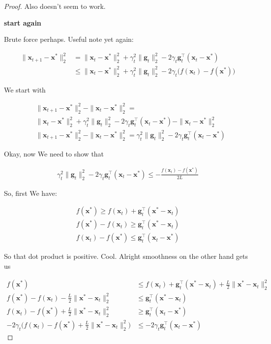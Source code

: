 \documentclass{article}
\begin{document}
\begin{proof}
	Also doesn't seem to work.
	
	\textbf{start again}
	
	Brute force perhaps. Useful note yet again:
	
	\begin{align}
		\|\mathbf{x}_{t+1} - \mathbf{x}^*\|^2_2 &= \|\mathbf{x}_t  - \mathbf{x}^* \|^2_2 + \gamma_t^2\|\mathbf{g}_t\|^2_2 - 2 \gamma_t\mathbf{g}^\top_t(\mathbf{x}_t - \mathbf{x}^*) \\
		&\le \|\mathbf{x}_t  - \mathbf{x}^* \|^2_2 + \gamma_t^2\|\mathbf{g}_t\|^2_2 - 2\gamma_t\big( f(\mathbf{x}_t) - f(\mathbf{x}^*) \big)
	\end{align}
	
	We start with
	
	\begin{align}
		&\|\mathbf{x}_{t+1} - \mathbf{x}^*\|^2_2 - \|\mathbf{x}_{t} - \mathbf{x}^*\|^2_2= \\
		&\|\mathbf{x}_t  - \mathbf{x}^* \|^2_2 + \gamma_t^2\|\mathbf{g}_t\|^2_2 - 2 \gamma_t\mathbf{g}^\top_t(\mathbf{x}_t - \mathbf{x}^*) -  \|\mathbf{x}_{t} - \mathbf{x}^*\|^2_2 \\
		&\|\mathbf{x}_{t+1} - \mathbf{x}^*\|^2_2 - \|\mathbf{x}_{t} - \mathbf{x}^*\|^2_2= \gamma_t^2\|\mathbf{g}_t\|^2_2 - 2 \gamma_t\mathbf{g}^\top_t(\mathbf{x}_t - \mathbf{x}^*) 
	\end{align}
	
	Okay, now We need to show that 
	
	\begin{align}
		\gamma_t^2\|\mathbf{g}_t\|^2_2 - 2 \gamma_t\mathbf{g}^\top_t(\mathbf{x}_t - \mathbf{x}^*) \le - \frac{f(\mathbf{x}_t) - f(\mathbf{x}^*)}{2L}
	\end{align}
	
	So,  first We have:
	
	\begin{align}
		f(\mathbf{x}^*) \ge f(\mathbf{x}_t) + \mathbf{g}_t^\top(\mathbf{x}^* - \mathbf{x}_t)\\
		f(\mathbf{x}^*) - f(\mathbf{x}_t) \ge \mathbf{g}_t^\top(\mathbf{x}^* - \mathbf{x}_t)\\
		f(\mathbf{x}_t) - f(\mathbf{x}^*)  \le \mathbf{g}_t^\top(\mathbf{x}_t - \mathbf{x}^*)
	\end{align}
	
	So that dot product is positive. Cool. Alright smoothness on the other hand gets us
	
	\begin{align}
		f(\mathbf{x}^*) &\le f(\mathbf{x}_t) + \mathbf{g}_t^\top(\mathbf{x}^* - \mathbf{x}_t) + \frac{L}{2}\|\mathbf{x}^* - \mathbf{x}_t\|^2_2\\
		f(\mathbf{x}^*) - f(\mathbf{x}_t) - \frac{L}{2}\|\mathbf{x}^* - \mathbf{x}_t\|^2_2 &\le  \mathbf{g}_t^\top(\mathbf{x}^* - \mathbf{x}_t) \\
		f(\mathbf{x}_t) - f(\mathbf{x}^*)  + \frac{L}{2}\|\mathbf{x}^* - \mathbf{x}_t\|^2_2 &\ge  \mathbf{g}_t^\top(\mathbf{x}_t - \mathbf{x}^*) \\
		-2\gamma_t\bigg( f(\mathbf{x}_t) - f(\mathbf{x}^*)  + \frac{L}{2}\|\mathbf{x}^* - \mathbf{x}_t\|^2_2 \bigg) &\le  -2\gamma_t \mathbf{g}_t^\top(\mathbf{x}_t - \mathbf{x}^*) 
	\end{align}
	

\end{proof}
\end{document}
